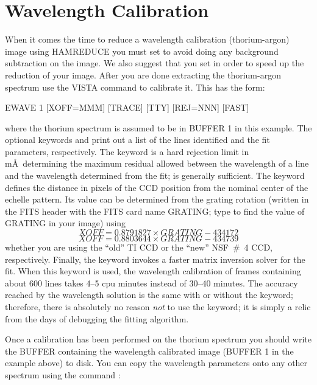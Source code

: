 
\section{Wavelength Calibration}
\label{sec:hamwave}

When it comes the time to reduce a wavelength calibration (thorium-argon)
image using {\tenit HAMREDUCE} you must set  to avoid doing any
background subtraction on the image. We also suggest that you set
  in order to speed up the reduction
of your image. After you are done extracting the thorium-argon spectrum use
the VISTA command  to calibrate it.  This has the form:

\begin{command}
  \item {EWAVE 1 [XOFF=MMM] [TRACE] [TTY] [REJ=NNN] [FAST]}
\end{command}

\noindent
where the thorium spectrum is assumed to be in BUFFER 1 in this example. The
optional keywords  and  print out a list of the lines
identified and the fit parameters, respectively. The keyword  is a
hard rejection limit in m\AA\ determining the maximum residual allowed between
the wavelength of a line and the wavelength determined from the fit;
 is generally sufficient. The keyword  defines the
distance in pixels of the CCD position from the nominal center of the echelle
pattern. Its value can be determined from the grating rotation (written in the
FITS header with the FITS card name GRATING; type  to
find the value of GRATING in your image) using
$$ XOFF = 0.8791827 \times GRATING - 434172$$
$$ XOFF = 0.8803644 \times GRATING - 434739$$
\noindent
whether you are using the ``old'' TI CCD or the ``new'' NSF~\#~4 CCD,
respectively.  Finally, the  keyword invokes a faster matrix
inversion solver for the fit. When this keyword is used, the wavelength
calibration of frames containing about 600 lines takes 4--5 cpu minutes
instead of 30--40 minutes. The accuracy reached by the wavelength solution is
the same with or without the  keyword; therefore, there is
absolutely no reason {\it not} to use the  keyword; it is simply a
relic from the days of debugging the fitting algorithm.


Once a calibration has been performed on the thorium spectrum you should write
the BUFFER containing the wavelength calibrated image (BUFFER 1 in the example
above) to disk. You can copy the wavelength parameters onto any other spectrum
using the command :

